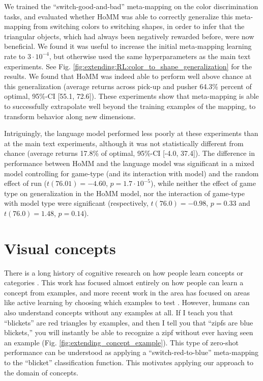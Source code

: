 We trained the ``switch-good-and-bad'' meta-mapping on the color discrimination tasks, and evaluated whether HoMM was able to correctly generalize this meta-mapping from switching colors to switching shapes, in order to infer that the triangular objects, which had always been negatively rewarded before, were now beneficial. We found it was useful to increase the initial meta-mapping learning rate to \(3\cdot 10^{-4}\), but otherwise used the same hyperparameters as the main text experiments. See Fig. \ref{fig:extending:RL:color_to_shape_generalization} for the results. We found that HoMM was indeed able to perform well above chance at this generalization (average returns across pick-up and pusher 64.3\% percent of optimal, 95\%-CI [55.1, 72.6]). These experiments show that meta-mapping is able to successfully extrapolate well beyond the training examples of the mapping, to transform behavior along new dimensions.

Intriguingly, the language model performed less poorly at these experiments than at the main text experiments, although it was not statistically different from chance (average returns 17.8\% of optimal, 95\%-CI [-4.0, 37.4]). The difference in performance between HoMM and the language model was significant in a mixed model controlling for game-type (and its interaction with model) and the random effect of run (\(t(76.01) = -4.60\), \(p =1.7 \cdot 10^{-5}\)), while neither the effect of game type on generalization in the HoMM model, nor the interaction of game-type with model type were significant (respectively, \(t(76.0) = -0.98\), \(p = 0.33\) and \(t(76.0) = 1.48\), \(p = 0.14\)).


\section{Visual concepts} \label{sec:extending:concepts}

There is a long history of cognitive research on how people learn concepts or categories \citep{Bourne1970, Medin1978, Kruschke1992, Goodman2008}. This work has focused almost entirely on how people can learn a concept from examples, and more recent work in the area has focused on areas like active learning by choosing which examples to test \citep{Markant2014, Markant2015}. However, humans can also understand concepts without any examples at all. If I teach you that ``blickets'' are red triangles by examples, and then I tell you that ``zipfs are blue blickets,'' you will instantly be able to recognize a zipf without ever having seen an example (Fig. \ref{fig:extending_concept_example}). This type of zero-shot performance can be understood as applying a ``switch-red-to-blue'' meta-mapping to the ``blicket'' classification function. This motivates applying our approach to the domain of concepts. \par 

